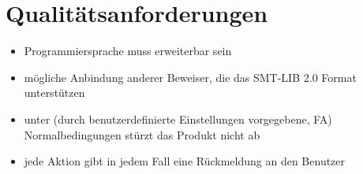 \documentclass[a4paper,10pt]{article}
\begin{document}
\section{Qualit\"{a}tsanforderungen}
\begin{itemize}
  \item Programmiersprache muss erweiterbar sein
  \item m\"{o}gliche Anbindung anderer Beweiser, die das SMT-LIB 2.0 Format unterst\"{u}tzen
  \item unter (durch benutzerdefinierte Einstellungen vorgegebene, FA) Normalbedingungen st\"{u}rzt das Produkt nicht ab
  \item jede Aktion gibt in jedem Fall eine R\"{u}ckmeldung an den Benutzer
\end{itemize}
\end{document}
